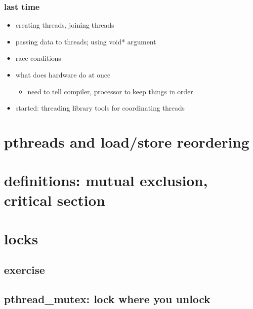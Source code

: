\date{}
\title{}
\date{}

\begin{frame}
    \titlepage
\end{frame}



\begin{frame}
\frametitle{last time}
\begin{itemize}
\item creating threads, joining threads
\item passing data to threads; using void* argument
\item race conditions
\item what does hardware do at once
    \begin{itemize}
    \item need to tell compiler, processor to keep things in order
    \end{itemize}
\item started: threading library tools for coordinating threads
\end{itemize}
\end{frame}

\section{pthreads and load/store reordering}


\section{definitions: mutual exclusion, critical section}


\section{locks}




\subsection{exercise}


\subsection{pthread\_mutex: lock where you unlock}


